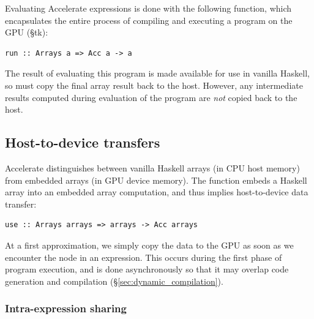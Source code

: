 Evaluating Accelerate expressions is done with the following function, which
encapsulates the entire process of compiling and executing a program on the GPU
(\S tk):
%
\begin{lstlisting}[style=haskell,numbers=none]
    run :: Arrays a => Acc a -> a
\end{lstlisting}
%
The result of evaluating this program is made available for use in vanilla
Haskell, so  must copy the final array result back to the host.
However, any intermediate results computed during evaluation of the program are
\emph{not} copied back to the host.


\subsection{Host-to-device transfers}

Accelerate distinguishes between vanilla Haskell arrays (in CPU host memory)
from embedded arrays (in GPU device memory). The function  embeds a
Haskell array into an embedded array computation, and thus implies
host-to-device data transfer:
%
\begin{lstlisting}[style=haskell,numbers=none]
    use :: Arrays arrays => arrays -> Acc arrays
\end{lstlisting}
%

At a first approximation, we simply copy the data to the GPU as soon as we
encounter the  node in an expression. This occurs during the first
phase of program execution, and is done asynchronously so that it may overlap
code generation and compilation (\S\ref{sec:dynamic_compilation}).

\subsubsection{Intra-expression sharing}


